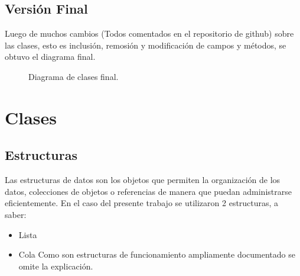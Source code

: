 \documentclass[12pt]{article} %
\begin{document}
\subsection{Versión Final}
Luego de muchos cambios (Todos comentados en el repositorio de github) sobre las clases, esto es inclusión, remosión y modificación de campos y métodos, se obtuvo el diagrama final.

\begin{figure}[H] %
\caption{Diagrama de clases final.}
\label{fig:DC_vF}
\end{figure}

\section{Clases}
\subsection{Estructuras}
Las estructuras de datos son los objetos que permiten la organización de los datos, colecciones de objetos o referencias de manera que puedan administrarse eficientemente.
En el caso del presente trabajo se utilizaron 2 estructuras, a saber:
\begin{itemize}
\item Lista
\item Cola
Como son estructuras de funcionamiento ampliamente documentado se omite la explicación.
\end{itemize}
\end{document}
